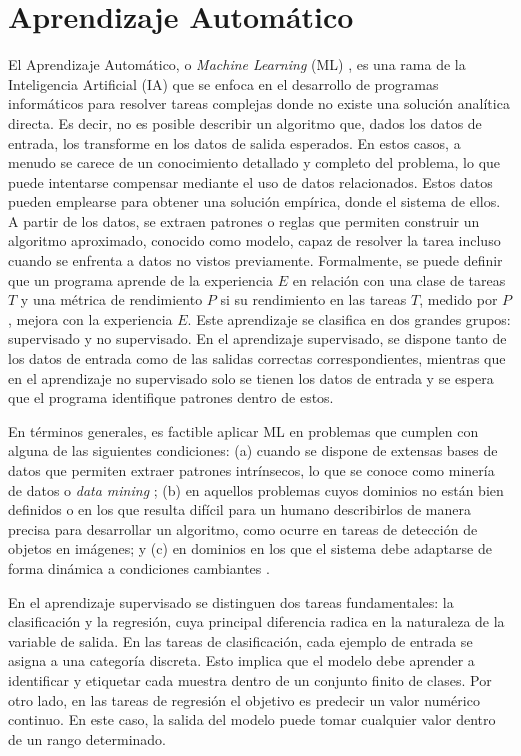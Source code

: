 \section{Aprendizaje Automático}
\label{section2:ML}
El Aprendizaje Automático, o \textit{Machine Learning} (ML) \cite{abu-mostafa_learning_2012, bishop_pattern_2019, murphy_probabilistic_2022, murphy_probabilistic_2023, 6284961}, es una rama de la Inteligencia Artificial (IA) que se enfoca en el desarrollo de programas informáticos para resolver tareas complejas donde no existe una solución analítica directa. Es decir, no es posible describir un algoritmo que, dados los datos de entrada, los transforme en los datos de salida esperados. En estos casos, a menudo se carece de un conocimiento detallado y completo del problema, lo que puede intentarse compensar mediante el uso de datos relacionados. Estos datos pueden emplearse para obtener una solución empírica, donde el sistema  de ellos. A partir de los datos, se extraen patrones o reglas que permiten construir un algoritmo aproximado, conocido como modelo, capaz de resolver la tarea incluso cuando se enfrenta a datos no vistos previamente. Formalmente, se puede definir que un programa aprende de la experiencia $E$ en relación con una clase de tareas $T$ y una métrica de rendimiento $P$ si su rendimiento en las tareas $T$, medido por $P$, mejora con la experiencia $E$. Este aprendizaje se clasifica en dos grandes grupos: supervisado y no supervisado. En el aprendizaje supervisado, se dispone tanto de los datos de entrada como de las salidas correctas correspondientes, mientras que en el aprendizaje no supervisado solo se tienen los datos de entrada y se espera que el programa identifique patrones dentro de estos.

En términos generales, es factible aplicar ML en problemas que cumplen con alguna de las siguientes condiciones: (a) cuando se dispone de extensas bases de datos que permiten extraer patrones intrínsecos, lo que se conoce como minería de datos o \textit{data mining} \cite{alma991006986149704990}; (b) en aquellos problemas cuyos dominios no están bien definidos o en los que resulta difícil para un humano describirlos de manera precisa para desarrollar un algoritmo, como ocurre en tareas de detección de objetos en imágenes; y (c) en dominios en los que el sistema debe adaptarse de forma dinámica a condiciones cambiantes \cite{murphy_probabilistic_2023}.

En el aprendizaje supervisado se distinguen dos tareas fundamentales: la clasificación y la regresión, cuya principal diferencia radica en la naturaleza de la variable de salida. En las tareas de clasificación, cada ejemplo de entrada se asigna a una categoría discreta. Esto implica que el modelo debe aprender a identificar y etiquetar cada muestra dentro de un conjunto finito de clases. Por otro lado, en las tareas de regresión el objetivo es predecir un valor numérico continuo. En este caso, la salida del modelo puede tomar cualquier valor dentro de un rango determinado.

